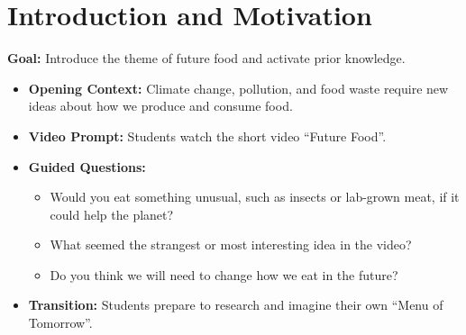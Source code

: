 \documentclass[11pt, a4paper]{article}
\begin{document}
\section{Introduction and Motivation}
\textbf{Goal:} Introduce the theme of future food and activate prior knowledge.
\begin{itemize}
    \item \textbf{Opening Context:} Climate change, pollution, and food waste require new ideas about how we produce and consume food.
    \item \textbf{Video Prompt:} Students watch the short video ``Future Food''.
    \item \textbf{Guided Questions:}
    \begin{itemize}
        \item Would you eat something unusual, such as insects or lab-grown meat, if it could help the planet?
        \item What seemed the strangest or most interesting idea in the video?
        \item Do you think we will need to change how we eat in the future?
    \end{itemize}
    \item \textbf{Transition:} Students prepare to research and imagine their own ``Menu of Tomorrow''.
\end{itemize}
\end{document}
